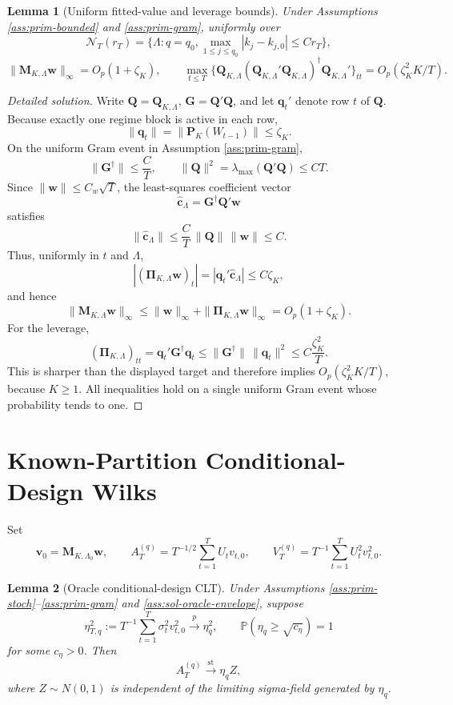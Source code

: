 \documentclass[12pt]{article}
\numberwithin{equation}{section}
\newtheorem{lemma}{Lemma}
\theoremstyle{definition}
\newcommand{\Pp}{\mathbb P}
\begin{document}
\begin{lemma}[Uniform fitted-value and leverage bounds]
\label{lem:wb-leverage}
Under Assumptions \ref{ass:prim-bounded} and \ref{ass:prim-gram}, uniformly over
\[
    \mathcal N_T(r_T)=
    \{\Lambda: q=q_0,
      \max_{1\leq j\leq q_0}|k_j-k_{j,0}|\leq Cr_T\},
\]
\[
    \|\bm M_{K,\Lambda}\bm w\|_\infty=O_p(1+\zeta_K),
    \qquad
    \max_{t\leq T}\{\bm Q_{K,\Lambda}(\bm Q_{K,\Lambda}'\bm Q_{K,\Lambda})^\dagger\bm Q_{K,\Lambda}'\}_{tt}
    =
    O_p(\zeta_K^2K/T).
\]
\end{lemma}


\begin{proof}[Detailed solution]
Write \(\bm Q=\bm Q_{K,\Lambda}\), \(\bm G=\bm Q'\bm Q\), and let
\(\bm q_t'\) denote row \(t\) of \(\bm Q\).  Because exactly one regime block
is active in each row,
\[
    \|\bm q_t\|=\|\bm P_K(W_{t-1})\|\leq\zeta_K.
\]
On the uniform Gram event in Assumption \ref{ass:prim-gram},
\[
    \|\bm G^\dagger\|\leq \frac{C}{T},
    \qquad
    \|\bm Q\|^2=\lambda_{\max}(\bm Q'\bm Q)\leq CT.
\]
Since \(\|\bm w\|\leq C_w\sqrt T\), the least-squares coefficient vector
\[
    \widehat{\bm c}_\Lambda=\bm G^\dagger\bm Q'\bm w
\]
satisfies
\[
    \|\widehat{\bm c}_\Lambda\|
    \leq \frac{C}{T}\,\|\bm Q\|\,\|\bm w\|
    \leq C.
\]
Thus, uniformly in \(t\) and \(\Lambda\),
\[
    |(\bm\Pi_{K,\Lambda}\bm w)_t|
    =|\bm q_t'\widehat{\bm c}_\Lambda|
    \leq C\zeta_K,
\]
and hence
\[
    \|\bm M_{K,\Lambda}\bm w\|_\infty
    \leq \|\bm w\|_\infty+
          \|\bm\Pi_{K,\Lambda}\bm w\|_\infty
    =O_p(1+\zeta_K).
\]
For the leverage,
\[
    (\bm\Pi_{K,\Lambda})_{tt}
    =\bm q_t'\bm G^\dagger\bm q_t
    \leq \|\bm G^\dagger\|\,\|\bm q_t\|^2
    \leq C\frac{\zeta_K^2}{T}.
\]
This is sharper than the displayed target and therefore implies
\(O_p(\zeta_K^2K/T)\), because \(K\geq1\).  All inequalities hold on a single
uniform Gram event whose probability tends to one.
\end{proof}


\section{Known-Partition Conditional-Design Wilks}

Set
\[
    \bm v_0=\bm M_{K,\Lambda_0}\bm w,
    \qquad
    A_T^{(q)}=T^{-1/2}\sum_{t=1}^TU_tv_{t,0},
    \qquad
    V_T^{(q)}=T^{-1}\sum_{t=1}^TU_t^2v_{t,0}^2.
\]

\begin{lemma}[Oracle conditional-design CLT]
\label{lem:wb-oracle-clt}
Under Assumptions \ref{ass:prim-stoch}--\ref{ass:prim-gram} and
\ref{ass:sol-oracle-envelope}, suppose
\[
    \eta_{T,q}^2:=T^{-1}\sum_{t=1}^T \sigma_t^2v_{t,0}^2
    \xrightarrow{p}\eta_q^2,
    \qquad
    \Pp(\eta_q\geq \sqrt{c_\eta})=1
\]
for some \(c_\eta>0\). Then
\[
    A_T^{(q)}\xrightarrow{\mathrm{st}}\eta_qZ,
\]
where \(Z\sim N(0,1)\) is independent of the limiting sigma-field generated by
\(\eta_q\).
\end{lemma}
\end{document}
